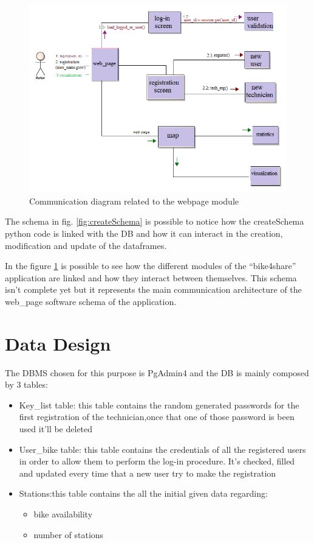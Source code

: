 \documentclass{article}
\begin{document}
\begin{figure}[H]
    \centering
    \includegraphics[width=0.75\linewidth]{image/comunication_architecture.png}
    \caption{Communication diagram related to the webpage module}
    \label{fig:webpage}
\end{figure}

The schema in fig. \ref{fig:createSchema} is possible to notice how the createSchema python code is linked with the DB and how it can interact in the creation, modification and update of the dataframes.

In the figure \ref{fig:webpage} is possible to see how the different modules of the “bike4share” application are linked and how they interact between themselves. This schema isn’t complete yet but it represents the main communication architecture of the web\_page software schema of the application.

\section{Data Design}
The DBMS chosen for this purpose is PgAdmin4 and the DB is mainly composed by 3 tables:
\begin{itemize}
\item Key\_list table: this table contains the random generated passwords for the first registration of the technician,once that one of those password is been used it’ll be deleted 
\item User\_bike table: this table contains the credentials of all the registered users in order to allow them to perform the log-in procedure. It’s checked, filled and updated every time that a new user try to make the registration
\item Stations:this table contains the all the initial given data regarding:
 \begin{itemize}
 \item bike availability
 \item number of stations
 \end{itemize}
\end{itemize}
\end{document}
